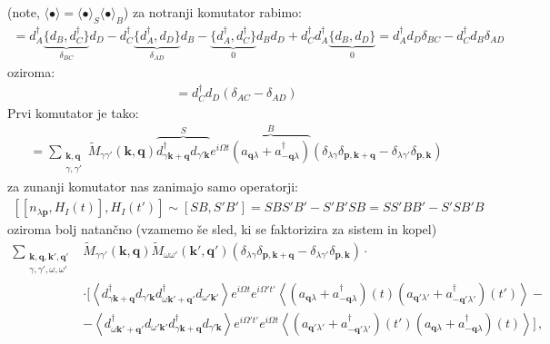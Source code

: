 \documentclass[a4paper,10pt]{article}
\renewcommand{\vec}[1]{\mathbf{#1}}
\begin{document}
(note, $\langle\bullet\rangle = \langle\bullet\rangle_S \langle\bullet\rangle_B$) za notranji komutator rabimo:
\begin{align}
  [d_A^\dagger d_B, d_C^\dagger d_D] = d_A^\dagger \underbrace{\{d_B, d_C^\dagger\}}_{\delta_{BC}} d_D - d_C^\dagger \underbrace{\{d_A^\dagger, d_D\}}_{\delta_{AD}} d_B - \underbrace{\{d_A^\dagger, d_C^\dagger\}}_{0} d_B d_D + d_C^\dagger d_A^\dagger \underbrace{\{d_B, d_D\}}_{0}= d_A^\dagger d_D \delta_{BC} - d_C^\dagger d_B \delta_{AD}
\end{align}
oziroma: 
\begin{align}
  [d_A^\dagger d_A, d_C^\dagger d_D] = d_C^\dagger d_D (\delta_{AC} -  \delta_{AD})
\end{align}
Prvi komutator je tako: 
\begin{align}
  [n_{\lambda \vec{p}}, H_{I}(t)] = \sum_{\substack{\vec{k}, \vec{q} \\ \gamma, \gamma'}} \widetilde{M}_{\gamma \gamma'}{(\vec{k}, \vec{q})} \overbrace{d_{\gamma \vec{k}+\vec{q}}^\dagger d_{\gamma' \vec{k}}}^{S} e^{i \Omega t} \overbrace{\left(a_{\vec{q} \lambda} + a_{-\vec{q} \lambda}^\dagger\right)}^{B} \left(\delta_{\lambda \gamma} \delta_{\vec{p}, \vec{k}+\vec{q}} - \delta_{\lambda \gamma'} \delta_{\vec{p}, \vec{k}}\right)
\end{align}
za zunanji komutator nas zanimajo samo operatorji: 
\begin{align}
  \left[ \left[ n_{\lambda \vec{p}}, H_I(t) \right], H_I(t') \right] \sim [S B, S' B'] = S B S' B' - S' B' S B = S S' B B' - S' S B' B
\end{align}  
oziroma bolj natančno (vzamemo še sled, ki se faktorizira za sistem in kopel)
\begin{align}
  \sum_{\substack{{\vec{k}, \vec{q}, \vec{k}', \vec{q}'} \\ {\gamma, \gamma', \omega, \omega'}}}  & \widetilde{M}_{\gamma \gamma'}(\vec{k}, \vec{q}) \widetilde{M}_{\omega \omega'}(\vec{k}', \vec{q}') \left( \delta_{\lambda \gamma} \delta_{\vec{p}, \vec{k}+\vec{q}} - \delta_{\lambda \gamma'} \delta_{\vec{p}, \vec{k}} \right) \cdot \nonumber \\
  & \cdot \Bigg[ \left\langle d_{\gamma \vec{k}+\vec{q}}^\dagger d_{\gamma' \vec{k}}  d_{\omega \vec{k}'+\vec{q}'}^\dagger d_{\omega' \vec{k}'} \right\rangle e^{i \Omega t} e^{i \Omega' t'} \left\langle \left(a_{\vec{q} \lambda} + a_{-\vec{q} \lambda}^\dagger\right)(t) \left(a_{\vec{q}' \lambda'} + a_{-\vec{q}' \lambda'}^\dagger\right)(t') \right\rangle - \nonumber \\
  & - \left\langle d_{\omega \vec{k}'+\vec{q}'}^\dagger d_{\omega' \vec{k}'}  d_{\gamma \vec{k}+\vec{q}}^\dagger d_{\gamma' \vec{k}} \right\rangle e^{i \Omega' t'} e^{i \Omega t} \left\langle \left(a_{\vec{q}' \lambda'} + a_{-\vec{q}' \lambda'}^\dagger\right)(t') \left(a_{\vec{q} \lambda} + a_{-\vec{q} \lambda}^\dagger\right)(t) \right\rangle \Bigg]\,,
\end{align}
\end{document}
